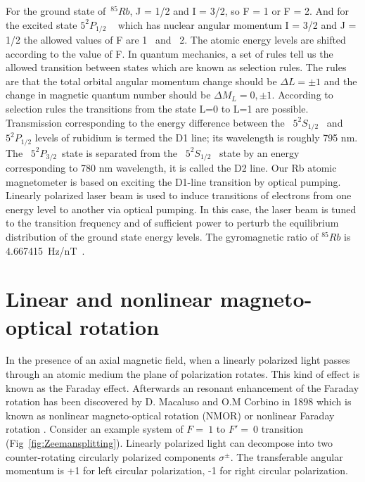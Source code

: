 For the ground state of~$^{85}{Rb}$, J = 1/2 and I = 3/2, so F = 1 or F = 2. And  for the excited state $5^2P_{1/2}$ ~  which has nuclear angular momentum I = 3/2 and J = 1/2  the allowed values of F are  1 ~and~ 2. The atomic energy levels are shifted according to the value of F. In quantum mechanics, a set of rules tell us the allowed transition between states which are known as selection rules. The rules are that the total orbital angular momentum change should be $\Delta L= \pm 1$ and the change in magnetic quantum number should be $\Delta M_L= 0,\pm 1$. According to selection rules the transitions from the state L=0 to L=1 are possible. Transmission corresponding to the energy difference between the ~$5^2S_{1/2}$~ and~ $5^2P_{1/2}$ levels of rubidium is termed the D1 line; its wavelength is roughly 795 nm\cite{doe:website}.  The ~$5^2P_{3/2}$~state is separated from the ~$5^2S_{1/2}$~ state by an energy corresponding to 780 nm wavelength, it is called the D2 line. Our Rb atomic magnetometer is based on exciting the D1-line transition by optical pumping.  Linearly polarized laser beam is used to induce transitions of electrons from one energy level to another via optical pumping. In this case, the laser beam is tuned to the transition frequency and of sufficient power to perturb the equilibrium distribution of the ground state energy levels. The gyromagnetic ratio of  $^{85}Rb$ is 4.667415~Hz/nT~\cite{bib:rb-gyro-reference}.
\section{Linear and nonlinear magneto-optical rotation }
In the presence of an axial magnetic field, when a linearly polarized light passes through an atomic medium the plane of polarization rotates. This kind of effect is known as the Faraday effect. Afterwards an resonant enhancement of the Faraday rotation has been discovered by D. Macaluso and O.M Corbino in 1898 which is known as nonlinear magneto-optical rotation (NMOR) or nonlinear Faraday rotation \cite{budker2013optical}. Consider an example system of $ F=~1$ to $F'=~0$ transition (Fig~\ref{fig:Zeemansplitting}).  Linearly polarized light can decompose into two counter-rotating circularly polarized components $\sigma^\pm$. The transferable angular momentum is +1 for left circular polarization, -1 for right circular polarization. 
 
